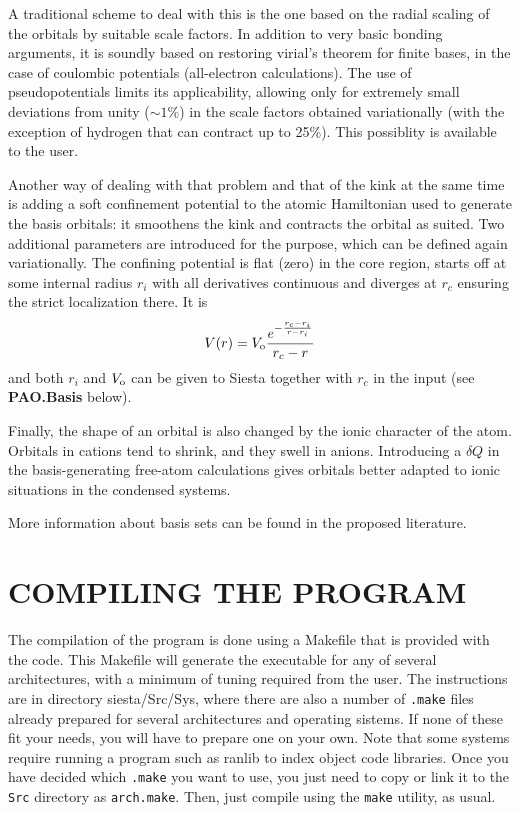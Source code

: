 \documentclass[11pt]{article}
\begin{document}
  A traditional scheme to deal with this is the one based on the radial 
scaling of the orbitals by suitable scale factors.
  In addition to very basic bonding arguments, it is
soundly based on restoring virial's theorem for finite bases, in the case
of coulombic potentials (all-electron calculations).
  The use of pseudopotentials limits its applicability, allowing only for
extremely small deviations from unity ($\sim 1\%$) in the scale factors 
obtained variationally (with the exception of hydrogen that can contract 
up to 25\%). This possiblity is available to the user.

  Another way of dealing with that problem and that of the kink at the
same time is adding a soft confinement potential to the atomic Hamiltonian 
used to generate the basis orbitals: it smoothens
the kink and contracts the orbital as suited. Two additional parameters
are introduced for the purpose, which can be defined again variationally.
  The confining potential  is flat (zero) in the core region, starts off at
some internal radius $r_i$ with all derivatives continuous
and diverges at $r_c$ ensuring the strict localization there.
  It is
\begin{equation}
  V(r) = V_{\rm o} { e^{- { {r_c - r_i} \over {r - r_i} } } \over {r_c -r} } 
\end{equation}
and both $r_i$ and $V_{\rm o}$ can be given to {\sc Siesta} together
with $r_c$ in the input (see {\bf PAO.Basis} below).

  Finally, the shape of an orbital is also changed by the ionic character 
of the atom. 
  Orbitals in cations tend to shrink, and they swell in anions.
  Introducing a $\delta Q$ in the basis-generating free-atom calculations
gives orbitals better adapted to ionic situations in the condensed
systems.

  More information about basis sets can be found in the proposed literature.

\section{COMPILING THE PROGRAM}

The compilation of the program is done using a Makefile
that is provided with the code.
This Makefile will generate the executable for any of several
architectures, with a  minimum of tuning required from the
user. The instructions are in directory siesta/Src/Sys, where 
there are also a number of {\tt .make} files
already prepared for several architectures and
operating sistems.
If none of these fit your needs, you will have to prepare
one on your own. Note that some systems require running a program such as
ranlib to index object code libraries.
Once you have decided which {\tt *.make} you want to use,
you just need to copy or link it to the {\tt Src} directory 
as {\tt arch.make}.
Then, just compile using the {\tt make} utility, as usual.
\end{document}
